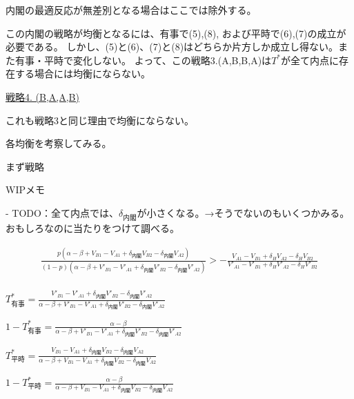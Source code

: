 \documentclass[main.tex]{subfiles}
\begin{document}
内閣の最適反応が無差別となる場合はここでは除外する。

この内閣の戦略が均衡となるには、有事で(5),(8), および平時で(6),(7)の成立が必要である。
しかし、(5)と(6)、(7)と(8)はどちらか片方しか成立し得ない。また有事・平時で変化しない。
よって、この戦略3.(A,B,B,A)は$T^*$が全て内点に存在する場合には均衡にならない。


\noindent
\underline{戦略4. (B,A,A,B)}

これも戦略3と同じ理由で均衡にならない。


\bigskip
各均衡を考察してみる。

まず戦略




























\newpage
WIPメモ

- TODO：全て内点では、$\delta_{内閣}$が小さくなる。→そうでないのもいくつかみる。おもしろなのに当たりをつけて調べる。

\begin{align*}
    \frac{ p( \alpha-\beta + V_{B1}-V_{A1} + \delta_{内閣}V_{B2} - \delta_{内閣}V_{A2} ) }{ (1-p)( \alpha-\beta + V'_{B1}-V'_{A1} + \delta_{内閣}V'_{B2} - \delta_{内閣}V'_{A2} ) }    >    - \frac{ V_{A1} - V_{B1} + \delta_H V_{A2} - \delta_H V_{B2} }{ V'_{A1} -V'_{B1} + \delta_H V'_{A2} - \delta_H V'_{B2} } \\[1em]
\end{align*}




\begin{definition} \Large$T^*_{有事} = \frac{ V'_{B1} - V'_{A1} +\delta_{内閣}V'_{B2} - \delta_{内閣}V'_{A2} }{ \alpha-\beta + V'_{B1}-V'_{A1} + \delta_{内閣}V'_{B2} - \delta_{内閣}V'_{A2} }$ \end{definition}

\begin{definition} \Large$1 - T^*_{有事} = \frac{ \alpha-\beta }{ \alpha-\beta + V'_{B1}-V'_{A1} + \delta_{内閣}V'_{B2} - \delta_{内閣}V'_{A2} }$ \end{definition}


\begin{definition} \Large$T^*_{平時} = \frac{ V_{B1} - V_{A1} +\delta_{内閣}V_{B2} - \delta_{内閣}V_{A2} }{ \alpha-\beta + V_{B1}-V_{A1} + \delta_{内閣}V_{B2} - \delta_{内閣}V_{A2} }$ \end{definition}

\begin{definition} \Large$1 - T^*_{平時} = \frac{ \alpha-\beta }{ \alpha-\beta + V_{B1}-V_{A1} + \delta_{内閣}V_{B2} - \delta_{内閣}V_{A2} }$ \end{definition}
\end{document}
